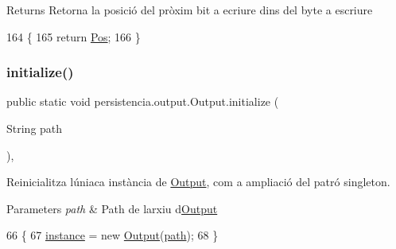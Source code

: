 \begin{DoxyReturn}{Returns}
Retorna la posició del pròxim bit a ecriure dins del byte a escriure 
\end{DoxyReturn}

\begin{DoxyCode}
164                             \{
165         \textcolor{keywordflow}{return} \hyperlink{classpersistencia_1_1output_1_1Output_a3709182600423f7e57644ccdd0016f22}{Pos};
166     \}
\end{DoxyCode}
\mbox{\label{classpersistencia_1_1output_1_1Output_a3c6c71990389c7142f5f362906c44f1a}} 
\subsubsection{\texorpdfstring{initialize()}{initialize()}}
{\footnotesize\ttfamily public static void persistencia.\+output.\+Output.\+initialize (\begin{DoxyParamCaption}\item[{String}]{path }\end{DoxyParamCaption})\hspace{0.3cm}{\ttfamily [inline]}, {\ttfamily [static]}}



Reinicialitza l\textquotesingle{}úniaca instància de \hyperlink{classpersistencia_1_1output_1_1Output}{Output}, com a ampliació del patró singleton. 


\begin{DoxyParams}{Parameters}
{\em path} & Path de l\textquotesingle{}arxiu d\textquotesingle{}\hyperlink{classpersistencia_1_1output_1_1Output}{Output} \\
\hline
\end{DoxyParams}

\begin{DoxyCode}
66                                                \{
67         \hyperlink{classpersistencia_1_1output_1_1Output_aaadf14a03c4f3f585170abdc7524b63d}{instance} = \textcolor{keyword}{new} \hyperlink{classpersistencia_1_1output_1_1Output_acbb70ea9eabb2a6d0b2d7bd2f3c9009a}{Output}(\hyperlink{classpersistencia_1_1output_1_1Output_aebef717882f3bcc7080dec014c6714c9}{path});
68     \}
\end{DoxyCode}
\mbox{\label{classpersistencia_1_1output_1_1Output_a416850e57f55bd371d60b2aae8e7e983}} 

